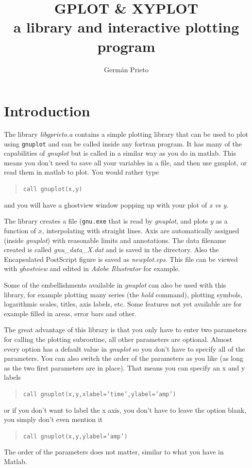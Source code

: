 \documentclass{article}
\title{GPLOT \& XYPLOT \\
	a library and interactive plotting program}
\author{Germ\'{a}n Prieto}
\begin{document}

\maketitle

\section{Introduction}
The library {\it libgprieto.a} contains a simple plotting library that can be used to plot using {\tt gnuplot} and can be called inside any fortran program. It has many of the capabilities of {\it gnuplot} but is called in a similar way as you do in matlab. This means you don't need to save all your variables in a file, and then use gnuplot, or read them in matlab to plot. You would rather type
\begin{quote}
\texttt{call gnuplot(x,y)}
\end{quote}
and you will have a ghostview window popping up with your plot of {\it x vs y}. 

The library creates a file ({\tt gnu.exe} that is read by {\it gnuplot}, and plots $y$ as a function of $x$, interpolating with straight lines. Axis are automatically assigned (inside {\it gnuplot}) with reasonable limits and annotations. 
The data filename created is called {\it gnu\_data\_X.dat} and is saved in the directory. Also the Encapsulated PostScript figure is saved as {\it newplot.eps}. This file can be viewed with {\it ghostview} and edited in {\it Adobe Illustrator} for example. 

Some of the embellishments available in {\it gnuplot} can also be used with this library, for example plotting many series (the {\it hold} command), plotting symbols, logarithmic scales, titles, axis labels, etc. Some features not yet available are for example filled in areas, error bars and other. 

The great advantage of this library is that you only have to enter two parameters for calling the plotting subroutine, all other parameters are optional. Almost every option has a default value in {\it gnuplot} so you don't have to specify all of the parameters. You can also switch the order of the parameters as you like (as long as the two first parameters are in place). That means you can specify an x and y labels
\begin{quote}
\texttt{call gnuplot(x,y,xlabel='time',ylabel='amp')}
\end{quote}
or if you don't want to label the x axis, you don't have to leave the option blank, you simply don't even mention it
\begin{quote}
\texttt{call gnuplot(x,y,ylabel='amp')}
\end{quote}
The order of the parameters does not matter, similar to what you have in Matlab. 
\end{document}
